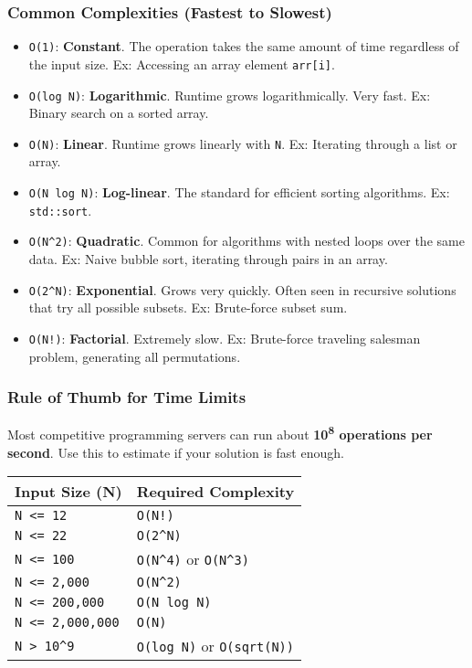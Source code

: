 \documentclass[10pt]{article}
\newcommand{\code}[1]{\texttt{#1}}
\begin{document}
\begin{multicols}{2}
\subsubsection{Common Complexities (Fastest to Slowest)}
\begin{itemize}
    \item \code{O(1)}: \textbf{Constant}. The operation takes the same amount of time regardless of the input size. Ex: Accessing an array element \code{arr[i]}.
    \item \code{O(log N)}: \textbf{Logarithmic}. Runtime grows logarithmically. Very fast. Ex: Binary search on a sorted array.
    \item \code{O(N)}: \textbf{Linear}. Runtime grows linearly with \code{N}. Ex: Iterating through a list or array.
    \item \code{O(N log N)}: \textbf{Log-linear}. The standard for efficient sorting algorithms. Ex: \code{std::sort}.
    \item \code{O(N^2)}: \textbf{Quadratic}. Common for algorithms with nested loops over the same data. Ex: Naive bubble sort, iterating through pairs in an array.
    \item \code{O(2^N)}: \textbf{Exponential}. Grows very quickly. Often seen in recursive solutions that try all possible subsets. Ex: Brute-force subset sum.
    \item \code{O(N!)}: \textbf{Factorial}. Extremely slow. Ex: Brute-force traveling salesman problem, generating all permutations.
\end{itemize}

\subsubsection{Rule of Thumb for Time Limits}
Most competitive programming servers can run about \textbf{10\textsuperscript{8} operations per second}. Use this to estimate if your solution is fast enough.

\begin{small}
\begin{tabular}{@{}ll@{}}
\toprule
\textbf{Input Size (N)} & \textbf{Required Complexity} \\
\midrule
\code{N <= 12} & \code{O(N!)} \\
\code{N <= 22} & \code{O(2^N)} \\
\code{N <= 100} & \code{O(N^4)} or \code{O(N^3)} \\
\code{N <= 2,000} & \code{O(N^2)} \\
\code{N <= 200,000} & \code{O(N log N)} \\
\code{N <= 2,000,000} & \code{O(N)} \\
\code{N > 10^9} & \code{O(log N)} or \code{O(sqrt(N))} \\
\bottomrule
\end{tabular}
\end{small}


\end{multicols}
\end{document}
